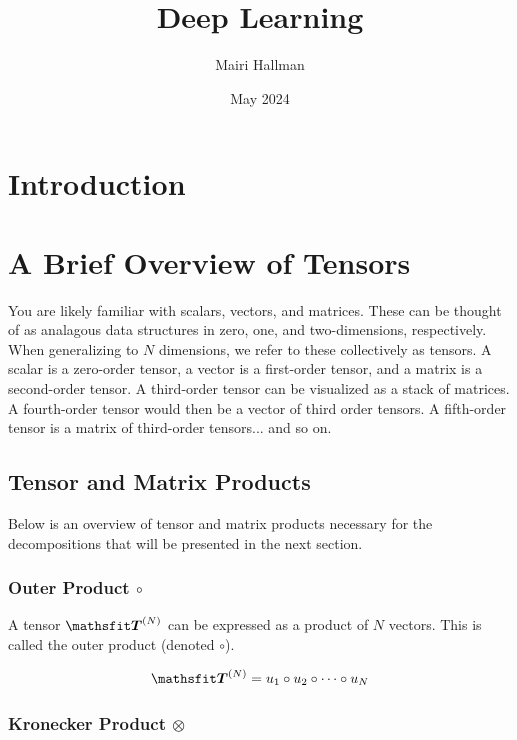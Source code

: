 \documentclass{article}
\title{Deep Learning}
\author{Mairi Hallman}
\date{May 2024}
\begin{document}
\maketitle

\newpage

\tableofcontents
\newpage

\section{Introduction}

\section{A Brief Overview of Tensors}

You are likely familiar with scalars, vectors, and matrices. These can be thought of as analagous data structures in zero, one, and two-dimensions, respectively. When generalizing to \(N\) dimensions, we refer to these collectively as tensors. A scalar is a zero-order tensor, a vector is a first-order tensor, and a matrix is a second-order tensor. A third-order tensor can be visualized as a stack of matrices. A fourth-order tensor would then be a vector of third order tensors. A fifth-order tensor is a matrix of third-order tensors... and so on.



\subsection{Tensor and Matrix Products}

Below is an overview of tensor and matrix products necessary for the decompositions that will be presented in the next section.

\subsubsection{Outer Product \(\circ\)}

A tensor \(\tT^{(N)}\) can be expressed as a product of \(N\) vectors. This is called the outer product (denoted \(\circ\)).

\begin{equation}
    \tT^{(N)} = u_1 \circ u_2 \circ \dots \circ u_N
\end{equation}


\subsubsection{Kronecker Product \(\otimes\)}
\end{document}

